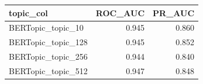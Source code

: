 \begin{tabular}{lrr}
\toprule
topic_col & ROC_AUC & PR_AUC \\
\midrule
BERTopic_topic_10 & 0.945 & 0.860 \\
BERTopic_topic_128 & 0.945 & 0.852 \\
BERTopic_topic_256 & 0.944 & 0.840 \\
BERTopic_topic_512 & 0.947 & 0.848 \\
\bottomrule
\end{tabular}
